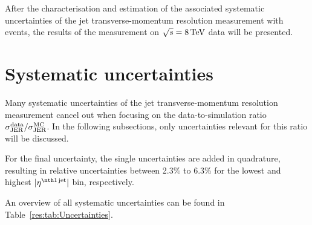After the characterisation and estimation of the associated systematic uncertainties of the jet transverse-momentum resolution measurement with \GAMJET events, the results of the measurement on $\sqrt{s}=8\,\text{Te}\kern-0.06667em\text{V}$ data will be presented.



\FloatBarrier
\chapter{Systematic uncertainties}

Many systematic uncertainties of the jet transverse-momentum resolution measurement cancel out when focusing on the data-to-simulation ratio $\sigma_\mathrm{JER}^{\text{data}}/\sigma_\mathrm{JER}^{\text{MC}}$.
In the following subsections, only uncertainties relevant for this ratio will be discussed.

For the final uncertainty, the single uncertainties are added in quadrature, resulting in relative uncertainties between 2.3\% to 6.3\% for the lowest and highest $|\etafirstjet|$ bin, respectively. 

An overview of all systematic uncertainties can be found in Table~\ref{res:tab:Uncertainties}.

